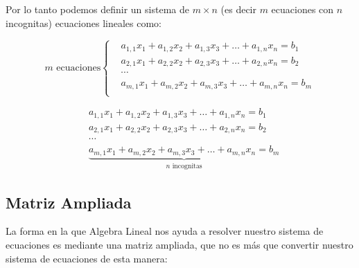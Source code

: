 \documentclass[12pt]{report}                                    %
\begin{document}
                Por lo tanto podemos definir un sistema de $m \times n$ (es decir $m$ ecuaciones
                con $n$ incognitas) ecuaciones lineales como:

                \begin{equation*}
                    m \text{ ecuaciones}
                    \begin{cases}
                        & a_{1,1}x_1 + a_{1,2}x_2 + a_{1,3}x_3 + \dots + a_{1,n}x_n = b_1 \\
                        & a_{2,1}x_1 + a_{2,2}x_2 + a_{2,3}x_3 + \dots + a_{2,n}x_n = b_2 \\
                        & \cdots \\
                        & a_{m,1}x_1 + a_{m,2}x_2 + a_{m,3}x_3 + \dots + a_{m,n}x_n = b_m \\
                    \end{cases}      
                \end{equation*}

                \begin{equation*}
                    \begin{split}
                        &a_{1,1}x_1 + a_{1,2}x_2 + a_{1,3}x_3 + \dots + a_{1,n}x_n = b_1 \\
                        &a_{2,1}x_1 + a_{2,2}x_2 + a_{2,3}x_3 + \dots + a_{2,n}x_n = b_2 \\
                        &\cdots \\
                        &\underbrace{a_{m,1}x_1 + a_{m,2}x_2 + a_{m,3}x_3 + \dots + a_{m,n}x_n = b_m}_\text{$n$ incognitas}
                    \end{split}
                \end{equation*}


            \clearpage
            \subsection{Matriz Ampliada}
                La forma en la que Algebra Lineal nos ayuda a resolver nuestro sistema de ecuaciones
                es mediante una matriz ampliada, que no es más que convertir nuestro sistema
                de ecuaciones de esta manera:
\end{document}
